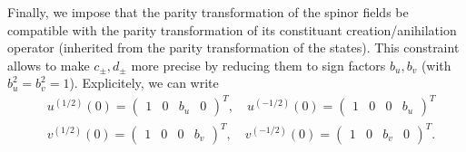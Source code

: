 \documentclass[10pt, a4paper]{article}
\begin{document}
Finally, we impose that the parity transformation of the spinor fields be compatible with the parity transformation of its constituant creation/anihilation operator (inherited from the parity transformation of the states). This constraint allows to make $c_\pm, d_\pm$ more precise by reducing them to sign factors $b_u, b_v$ (with $b_u^2 = b_v^2 = 1$). Explicitely, we can write 
\begin{align*}
  &u^{(1/2)}(0) = 
  \begin{pmatrix}
    1& 0& b_u& 0
  \end{pmatrix}^T,\quad
   u^{(-1/2)}(0) = 
  \begin{pmatrix}
    1& 0& 0& b_u
  \end{pmatrix}^T\\
  &v^{(1/2)}(0) = 
  \begin{pmatrix}
    1& 0& 0& b_v
  \end{pmatrix}^T,\quad
   v^{(-1/2)}(0) = 
  \begin{pmatrix}
    1& 0& b_v& 0
  \end{pmatrix}^T.
\end{align*}
\newpage
\end{document}
